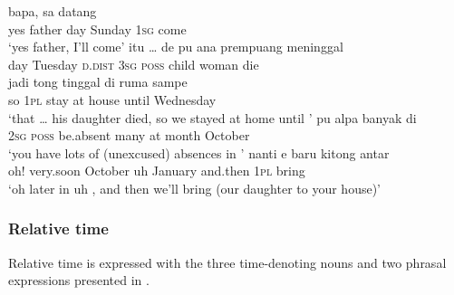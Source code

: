 \ea
\label{Example_5.79}
 {bapa,} {} {} {sa} {datang}\\ %
 yes  father  day  Sunday  \textsc{1sg}  come\\
\glt 
‘yes father,  I’ll come’ \textstyleExampleSource{[080922-001a-CvPh.0344]}
\z
\ea
\label{Example_5.80}
\gll {}  {{itu}} {{\ldots}} {{de}} {pu} {ana} {prempuang} {meninggal}\\ %
 {day}  {Tuesday}  \textsc{d.dist} {}    \textsc{3sg} \textsc{poss}  {child}  woman  die\\
 \gll  jadi  {tong}  {tinggal}  di  {ruma}  {sampe}  \\
 so  {\textsc{1pl}}  {stay}  at  {house}  {until}  {Wednesday}\\
\glt 
‘that  {\ldots} his daughter died, so we stayed at home until ’ \textstyleExampleSource{[080925-003-Cv.0001]}
\z
\ea
\label{Example_5.81}
 {pu} {alpa} {banyak} {di} {} {}\\ %
 \textsc{2sg}  \textsc{poss}  be.absent  many  at  month  October\\
\glt 
‘you have lots of (unexcused) absences in ’ \textstyleExampleSource{[081023-004-Cv.0015]}
\z
\ea
\label{Example_5.82}
 {nanti} {} {e} {} {baru} {kitong} {antar}\\ %
 oh!  very.soon  October  uh  January  and.then  \textsc{1pl}  bring\\
 ‘oh later in  uh , and then we’ll bring (our daughter to your house)’ \textstyleExampleSource{[081110-005-CvPr.0049]}
\z


\subsubsection[Relative time]{Relative time}
\label{Para_5.2.5.4}
Relative time is expressed with the three time-denoting nouns and two phrasal expressions presented in .


